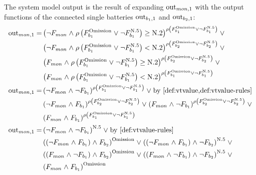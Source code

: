 The system model output is the result of expanding $\mathrm{out}_{mon,1}$ with the output functions of the connected single batteries $\mathrm{out}_{b_1,1}$ and $\mathrm{out}_{b_2,1}$:
\begin{align*}
\cout{mon}{1} = 
  &\left( 
    \lnot F_{mon} \land \VTValue\left( F_{b_1}^{\Omission} \lor 
    \lnot F_{b_1}^{\Nominal{5}} \right) \geq \Nominal{2}
  \right)^{\VTValue\left( F_{b_1}^{\Omission} \lor 
    \lnot F_{b_1}^{\Nominal{5}} \right)} \lor \\
  & \left(
    \lnot F_{mon} \land \VTValue\left( F_{b_1}^{\Omission} \lor 
    \lnot F_{b_1}^{\Nominal{5}}\right) < \Nominal{2}
  \right)^{\VTValue\left( F_{b_2}^{\Omission} \lor 
    \lnot F_{b_2}^{\Nominal{5}} \right) } \lor \\
  & \left(
    F_{mon} \land \VTValue\left( F_{b_1}^{\Omission} \lor 
    \lnot F_{b_1}^{\Nominal{5}}\right) \geq \Nominal{2}
  \right)^{\VTValue\left(F_{b_2}^{\Omission} \lor 
    \lnot F_{b_2}^{\Nominal{5}} \right)} \lor \\
  & \left(
    F_{mon} \land \VTValue\left( F_{b_1}^{\Omission} \lor 
    \lnot F_{b_1}^{\Nominal{5}}\right) < \Nominal{2}
  \right)^{\VTValue\left( F_{b_1}^{\Omission} \lor 
    \lnot F_{b_1}^{\Nominal{5}}\right)}\\
\cout{mon}{1} =
  &\left( 
    \lnot F_{mon} \land \lnot F_{b_1}  
  \right)^{\VTValue\left( F_{b_1}^{\Omission} \lor 
    \lnot F_{b_1}^{\Nominal{5}} \right)} \lor \text{by \cref{def:vtvalue,def:vtvalue-rules}}\\
  & \left(
    \lnot F_{mon} \land F_{b_1}
  \right)^{\VTValue\left( F_{b_2}^{\Omission} \lor 
    \lnot F_{b_2}^{\Nominal{5}} \right) } \lor 
  \left(
    F_{mon} \land \lnot F_{b_1}
  \right)^{\VTValue\left(F_{b_2}^{\Omission} \lor 
    \lnot F_{b_2}^{\Nominal{5}} \right)} \lor \\
  & \left(
    F_{mon} \land F_{b_1}
  \right)^{\VTValue\left( F_{b_1}^{\Omission} \lor 
    \lnot F_{b_1}^{\Nominal{5}}\right)}\\
\cout{mon}{1} =
  &\left( 
    \lnot F_{mon} \land \lnot F_{b_1}  
  \right)^{\Nominal{5}} \lor \text{by \cref{def:vtvalue-rules}}\\
  & \left(
    \left(\lnot F_{mon} \land F_{b_1}\right) \land F_{b_2} 
  \right)^{\Omission } \lor  
  \left(
    \left(\lnot F_{mon} \land F_{b_1}\right) \land \lnot F_{b_2}
  \right)^{\Nominal{5}} \lor \\ 
  & \left(
    \left(F_{mon} \land \lnot F_{b_1}\right) \land F_{b_2}
  \right)^{\Omission} \lor
  \left(
    \left(F_{mon} \land \lnot F_{b_1} \right) \land \lnot F_{b_2}
  \right)^{\Nominal{5}} \lor \\
  & \left(
    F_{mon} \land F_{b_1}
  \right)^{\Omission}
\end{align*}

